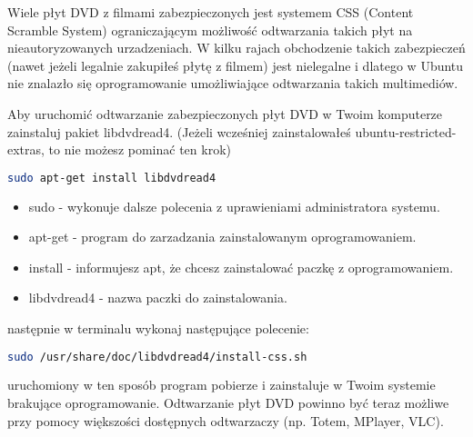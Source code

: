 Wiele płyt DVD z filmami zabezpieczonych jest systemem CSS (Content Scramble System) ograniczającym możliwość odtwarzania takich płyt na nieautoryzowanych urzadzeniach. W kilku rajach obchodzenie takich zabezpieczeń (nawet jeżeli legalnie zakupiłeś płytę z filmem) jest nielegalne i dlatego w Ubuntu nie znalazło się oprogramowanie umożliwiające odtwarzania takich multimediów.

Aby uruchomić odtwarzanie zabezpieczonych płyt DVD w Twoim komputerze zainstaluj pakiet \textcolor{ubuntu_orange}{libdvdread4}. (Jeżeli wcześniej zainstalowałeś ubuntu-restricted-extras, to nie możesz pominać ten krok)
\begin{lstlisting}[language=bash]
sudo apt-get install libdvdread4
\end{lstlisting}
\begin{itemize}
\item \textcolor{ubuntu_orange}{sudo} - wykonuje dalsze polecenia z uprawieniami administratora systemu.
\item \textcolor{ubuntu_orange}{apt-get} - program do zarzadzania zainstalowanym oprogramowaniem.
\item \textcolor{ubuntu_orange}{install} - informujesz apt, że chcesz zainstalować paczkę z oprogramowaniem.
\item \textcolor{ubuntu_orange}{libdvdread4} - nazwa paczki do zainstalowania.
\end{itemize}

następnie w terminalu wykonaj następujące polecenie:
\begin{lstlisting}[language=bash]
sudo /usr/share/doc/libdvdread4/install-css.sh
\end{lstlisting}
uruchomiony w ten sposób program pobierze i zainstaluje w Twoim systemie brakujące oprogramowanie. Odtwarzanie płyt DVD powinno być teraz możliwe przy pomocy większości dostępnych odtwarzaczy (np. Totem, MPlayer, VLC).